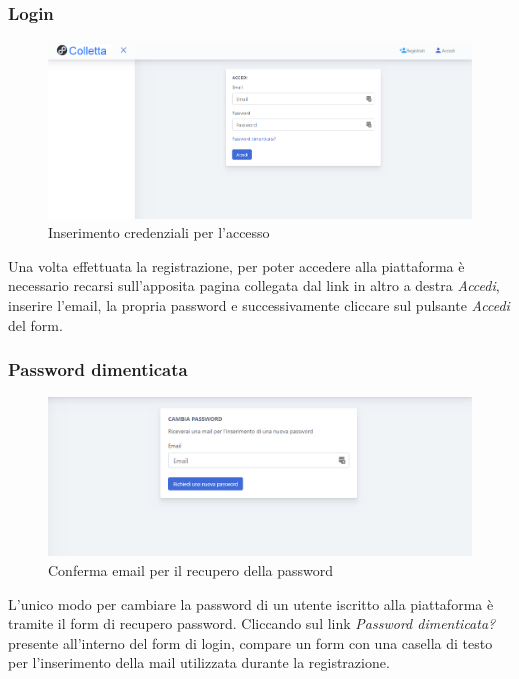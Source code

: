     \subsubsection{{Login}}
    	\begin{figure}[H]
        	\centering
        	\includegraphics[width=1\linewidth]{sez/img/autenticazione/formAccedi.PNG} 
        	\caption{Inserimento credenziali per l'accesso}\label{fig:1}
    	\end{figure}
Una volta effettuata la registrazione, per poter accedere alla piattaforma è necessario recarsi sull'apposita pagina collegata dal link in altro a destra \textit{Accedi}, inserire l'email, la propria password e successivamente cliccare sul pulsante \textit{Accedi} del form.

    \subsubsection{Password dimenticata}
    	\begin{figure}[H]
        	\centering
        	\includegraphics[width=1\linewidth]{sez/img/autenticazione/passwordDimenticata.png} 
        	\caption{Conferma email per il recupero della password}\label{fig:1}
    	\end{figure}
	L'unico modo per cambiare la password di un utente iscritto alla piattaforma è  tramite il form di recupero password. Cliccando sul link \textit{Password dimenticata?} presente all'interno del form di login, compare un form con una casella di testo per l'inserimento della mail utilizzata durante la registrazione. 
	
